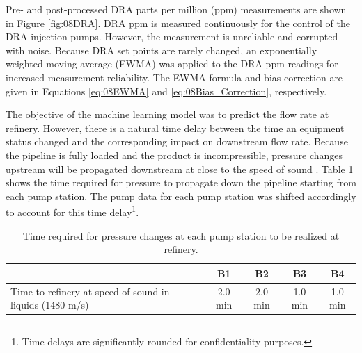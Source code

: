 Pre- and post-processed DRA parts per million (ppm) measurements are shown in Figure \ref{fig:08DRA}. DRA ppm is measured continuously for the control of the DRA injection pumps. However, the measurement is unreliable and corrupted with noise. Because DRA set points are rarely changed, an exponentially weighted moving average (EWMA) was applied to the DRA ppm readings for increased measurement reliability.  The EWMA formula and bias correction are given in Equations \ref{eq:08EWMA} and \ref{eq:08Bias_Correction}, respectively.

The objective of the machine learning model was to predict the flow rate at refinery.  However, there is a natural time delay between the time an equipment status changed and the corresponding impact on downstream flow rate.  Because the pipeline is fully loaded and the product is incompressible, pressure changes upstream will be propagated downstream at close to the speed of sound \cite{fluid_mechanics}.  Table \ref{tab:08TimeToCC} shows the time required for pressure to propagate down the pipeline starting from each pump station.  The pump data for each pump station was shifted accordingly to account for this time delay\footnote{Time delays are significantly rounded for confidentiality purposes.}.  
\begin{table}[h]
    \centering
    {
    \begin{tabular}{ p{6cm} | c | c | c | c}
             & B1 & B2 & B3 & B4 \\
        \hline
        Time to refinery at speed of sound in liquids (1480 m/s) \cite{fluid_mechanics}
        &  2.0 min  &  2.0 min  &  1.0 min  &  1.0 min  \\
    \end{tabular}}
    \caption{Time required for pressure changes at each pump station to be realized at refinery.}
    \label{tab:08TimeToCC}
\end{table}
